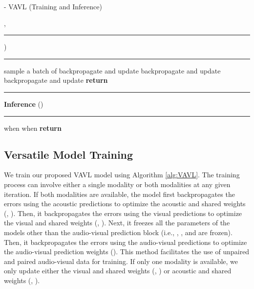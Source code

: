 \documentclass{article}
\begin{document}
\begin{algorithm} [t]
\caption{- VAVL (Training and Inference)}
\begin{algorithmic}[1]
\REQUIRE , 
\vspace{0.1cm}
\hrule
\vspace{0.1cm}
\hspace*{-2em} )
\vspace{0.1cm}
\hrule
\vspace{0.1cm}
\WHILE{}
    \STATE sample a batch of 
    \vspace{0.1cm}
    \IF{}
        \STATE{}
        \STATE{} 
        \STATE backpropagate and update 
    \ENDIF
    \vspace{0.1cm}
    \IF{}
        \STATE{}
        \STATE{} 
        \STATE backpropagate and update 
    \ENDIF
    \vspace{0.1cm}
    \IF{ \AND }
        \STATE  
        \STATE{}
        \STATE{} 
        \STATE backpropagate and update 
    \ENDIF
\ENDWHILE
\vspace{0.1cm}
\STATE \textbf{return} 
\vspace{0.1cm}
\hrule
\vspace{0.1cm}
\hspace*{-2em} \textbf{Inference} ()
\vspace{0.1cm}
\hrule
\vspace{0.1cm}
\IF{ \AND }
    \STATE{}
\vspace{0.1cm}
\STATE{} when 
\STATE{} when 
\ENDIF
\STATE \textbf{return} 
\end{algorithmic}
\label{alg:VAVL}
\end{algorithm}


\subsection{Versatile Model Training}
\label{ssec:training}

We train our proposed VAVL model using Algorithm \ref{alg:VAVL}. The training process can involve either a single modality or both modalities at any given iteration. If both modalities are available, the model first backpropagates the errors using the acoustic predictions to optimize the acoustic and shared weights (, ). Then, it backpropagates the errors using the visual predictions to optimize the visual and shared weights (, ). Next, it freezes all the parameters of the models other than the audio-visual prediction block (i.e., , , and  are frozen). Then, it backpropagates the errors using the audio-visual predictions to optimize the audio-visual prediction weights (). This method facilitates the use of unpaired and paired audio-visual data for training. If only one modality is available, we only update either the visual and shared weights (, ) or acoustic and shared weights (, ). 
\end{document}
